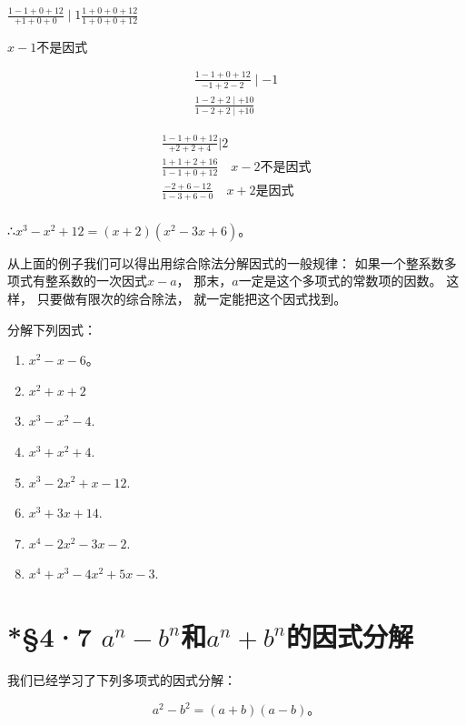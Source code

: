 \(\frac{1 - 1 + 0 + 12}{+1 + 0 + 0}\mid 1\)\(\frac{1 + 0 + 0 + 12}{1 + 0 + 0 + 12}\)

\(x - 1\)不是因式

\[
\begin{array}{l} \frac{1 - 1 + 0 + 12}{- 1 + 2 - 2} \mid - 1 \\ \frac{1 - 2 + 2 \mid + 10}{1 - 2 + 2 \mid + 10} \end{array}
\]

\[
\begin{array}{l} \frac{1 - 1 + 0 + 12}{+ 2 + 2 + 4} \left| 2 \right. \\ \frac{1 + 1 + 2 + 16}{1 - 1 + 0 + 12} \quad x - 2 \text{不是因式} \\ \frac{- 2 + 6 - 12}{1 - 3 + 6 - 0} \quad x + 2 \text{是因式} \\ \end{array}
\]

∴\(x^{3}-x^{2}+12=(x+2)(x^{2}-3x+6)\)。

从上面的例子我们可以得出用综合除法分解因式的一般规律：
如果一个整系数多项式有整系数的一次因式\(x - a\)，
那末，\(a\)一定是这个多项式的常数项的因数。 这样，
只要做有限次的综合除法， 就一定能把这个因式找到。

分解下列因式：

\begin{enumerate}[start=1]
\item
  \(x^{2} - x - 6\)。
\item
  \(x^{2} + x + 2\)
\item
  \(x^{3} - x^{2} - 4.\)
\item
  \(x^{3} + x^{2} + 4.\)
\item
  \(x^{3} - 2x^{2} + x - 12.\)
\item
  \(x^{3} + 3x + 14.\)
\item
  \(x^{4} - 2x^{2} - 3x - 2.\)
\item
  \(x^{4} + x^{3} - 4x^{2} + 5x - 3.\)
\end{enumerate}

\section{\texorpdfstring{*§4·7 \(a^n - b^n\)和\(a^n + b^n\)的因式分解}{*§4·7 a\^{}n - b\^{}n和a\^{}n + b\^{}n的因式分解}}\label{an---bnux548can-bnux7684ux56e0ux5f0fux5206ux89e3}

我们已经学习了下列多项式的因式分解：

\[
a ^{2} - b ^{2} = (a + b) (a - b)\text{。}
\]

